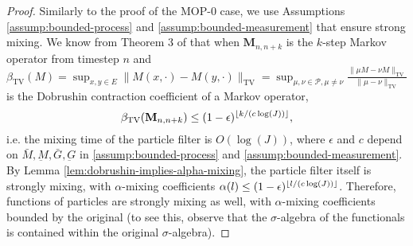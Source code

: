 \begin{proof}
Similarly to the proof of the MOP-$0$ case, we use Assumptions \ref{assump:bounded-process} and \ref{assump:bounded-measurement} that ensure strong mixing. We know from Theorem 3 of \cite{karjalainen23} that when $\textbf{M}_{n,n+k}$ is the $k$-step Markov operator from timestep $n$ and $\beta_{\text{TV}}(M) = \sup _{x, y \in E}\|M(x, \cdot)-M(y, \cdot)\|_{\mathrm{TV}}=\sup _{\mu, \nu \in \mathcal{P}, \mu \neq \nu} \frac{\|\mu M-\nu M\|_{\mathrm{TV}}}{\|\mu-\nu\|_{\mathrm{TV}}}$ is the Dobrushin contraction coefficient of a Markov operator, 
\begin{equation}
\beta_{\text{TV}}(\textbf{M}_{n,n+k}) \leq (1-\epsilon)^{\lfloor k/(c\log(J)) \rfloor},
\end{equation}
i.e. the mixing time of the particle filter is $O(\log(J))$, where $\epsilon$ and $c$ depend on $\bar{M}, \underbar{M}, \bar{G}, \underbar{G}$ in \ref{assump:bounded-process} and \ref{assump:bounded-measurement}. By Lemma \ref{lem:dobrushin-implies-alpha-mixing}, the particle filter itself is strongly mixing, with $\alpha$-mixing coefficients $\alpha(l) \leq (1-\epsilon)^{\lfloor l/(c\log(J)) \rfloor}$. Therefore, functions of particles are strongly mixing as well, with $\alpha$-mixing coefficients bounded by the original (to see this, observe that the $\sigma$-algebra of the functionals is contained within the original $\sigma$-algebra).


\end{proof}
